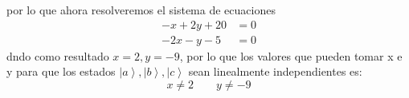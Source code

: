 \documentclass[12pt,letterpaper]{report}
\begin{document}
por lo que ahora resolveremos el sistema de ecuaciones
\begin{align*}
    -x+2y+20&=0\\
    -2x-y-5&=0
\end{align*}
dndo como resultado $x=2,y=-9$, por lo que los valores que pueden tomar x e y para que los estados $\left|a \right\rangle, \left|b \right\rangle,\left|c \right\rangle$
sean linealmente independientes es:
\begin{equation*}
    x\neq 2 \qquad y\neq -9
\end{equation*}
\end{document}
